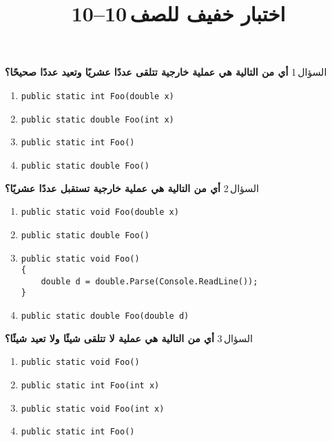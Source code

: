 \documentclass[13pt]{beamer}
\title{اختبار خفيف للصف\,10--10}
\author{}
\date{}
\begin{document}
\begin{frame}
  \titlepage
\end{frame}

\begin{frame}[fragile]{السؤال\,1}
\textbf{أي من التالية هي عملية خارجية تتلقى عددًا عشريًا وتعيد عددًا صحيحًا؟}

\begin{english}
\begin{enumerate}[label=(\alph*)]
  \item \texttt{public static int Foo(double x)}
  \item \texttt{public static double Foo(int x)}
  \item \texttt{public static int Foo()}
  \item \texttt{public static double Foo()}
\end{enumerate}
\end{english}
\end{frame}


\begin{frame}[fragile]{السؤال\,2}
\textbf{أي من التالية هي عملية خارجية تستقبل عددًا عشريًا؟}

\begin{english}
\begin{enumerate}[label=(\alph*)]
  \item \texttt{public static void Foo(double x)}
  \item \texttt{public static double Foo()}
  \item
  \begin{lstlisting}[language=CSharp]
public static void Foo()
{
    double d = double.Parse(Console.ReadLine());
}
  \end{lstlisting}
  \item \texttt{public static double Foo(double d)}
\end{enumerate}
\end{english}
\end{frame}


\begin{frame}[fragile]{السؤال\,3}
\textbf{أي من التالية هي عملية لا تتلقى شيئًا ولا تعيد شيئًا؟}

\begin{english}
\begin{enumerate}[label=(\alph*)]
  \item \texttt{public static void Foo()}
  \item \texttt{public static int Foo(int x)}
  \item \texttt{public static void Foo(int x)}
  \item \texttt{public static int Foo()}
\end{enumerate}
\end{english}
\end{frame}
\end{document}
